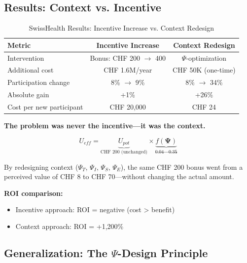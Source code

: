 \subsection{Results: Context vs. Incentive}

\begin{table}[htbp]
\centering
\caption{SwissHealth Results: Incentive Increase vs. Context Redesign}
\label{tab:V-swisshealth-results}
\renewcommand{\arraystretch}{1.3}
\begin{tabular}{@{}lcc@{}}
\toprule
\textbf{Metric} & \textbf{Incentive Increase} & \textbf{Context Redesign} \\
\midrule
Intervention & Bonus: CHF 200 $\rightarrow$ 400 & $\Psi$-optimization \\
Additional cost & CHF 1.6M/year & CHF 50K (one-time) \\
Participation change & 8\% $\rightarrow$ 9\% & 8\% $\rightarrow$ 34\% \\
Absolute gain & +1\% & +26\% \\
Cost per new participant & CHF 20,000 & CHF 24 \\
\bottomrule
\end{tabular}
\end{table}

\begin{tcolorbox}[colback=yellow!10!white, colframe=orange!75!black,
    title=\textbf{The Core Insight}]

\textbf{The problem was never the incentive---it was the context.}

\begin{equation}
U_{eff} = \underbrace{U_{pot}}_{\text{CHF 200 (unchanged)}} \times \underbrace{f(\boldsymbol{\Psi})}_{\text{0.04} \rightarrow \text{0.35}}
\end{equation}

By redesigning context ($\Psi_T$, $\Psi_I$, $\Psi_S$, $\Psi_E$), the same CHF 200 bonus
went from a perceived value of CHF 8 to CHF 70---without changing the actual amount.

\textbf{ROI comparison:}
\begin{itemize}[nosep]
    \item Incentive approach: ROI = negative (cost > benefit)
    \item Context approach: ROI = +1,200\%
\end{itemize}

\end{tcolorbox}

\subsection{Generalization: The $\Psi$-Design Principle}

